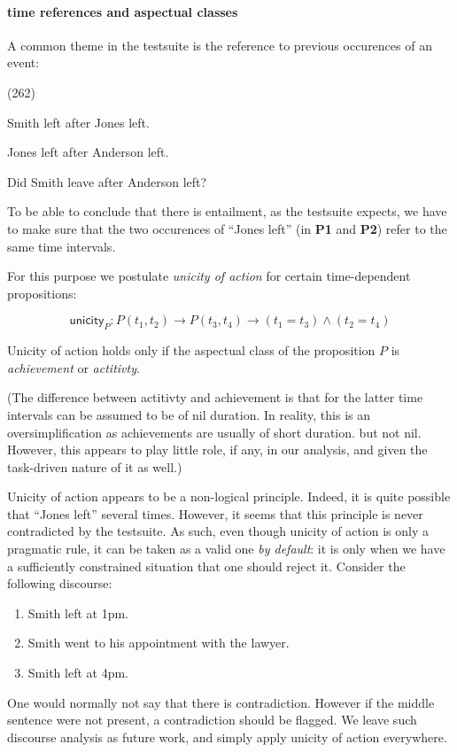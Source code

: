 \documentclass[a4paper,11pt]{article}
\newcommand\hyp{\item[H]}
\newcommand\fracasex[2]{\begin{lingex}\item[(#1)] \begin{subex} #2 \end{subex} \end{lingex} }
\newcommand\constant[1]{\mathsf{#1}}
\begin{document}
\paragraph{time references and aspectual classes}

A common theme in the testsuite is the reference to previous
occurences of an event:

\fracasex{262}{
\item	Smith left after Jones left.
\item	Jones left after Anderson left.
\hyp 	Did Smith leave after Anderson left?
}

To be able to conclude that there is entailment, as the testsuite expects, we have to make sure
that the two occurences of ``Jones left'' (in \textbf{P1} and \textbf{P2}) refer to the
same time intervals.

For this purpose we postulate \emph{unicity of action} for certain time-dependent
propositions:

\[\constant{unicity}_P : P (t_1,t_2) → P (t_3,t_4) → (t_1 = t_3) ∧ (t_2 = t_4)\]

Unicity of action holds only if the aspectual class of the proposition
$P$ is \emph{achievement} or \emph{actitivty}.

(The difference between actitivty and achievement is that for the
latter time intervals can be assumed to be of nil duration. In reality, this is an oversimplification as achievements are usually of short duration. but not nil. However, 
this appears to play little role, if any, in our analysis, and given the task-driven nature of it as well.)

Unicity of action appears to be a non-logical principle. Indeed, it is
quite possible that ``Jones left'' several times. However, it seems
that this principle is never contradicted by the testsuite. As such,
even though unicity of action is only a pragmatic rule, it can be
taken as a valid one \emph{by default}: it is only when we have a
sufficiently constrained situation that one should reject it. Consider
the following discourse:
\begin{enumerate}[parsep=0pt,itemsep=1pt,label=(\arabic*)]
\item Smith left at 1pm.
\item Smith went to his appointment with the lawyer.
\item Smith left at 4pm.
\end{enumerate}
One would normally not say that there is contradiction. However if the
middle sentence were not present, a contradiction should be
flagged. We leave such discourse analysis as future work, and simply
apply unicity of action everywhere.
\end{document}
